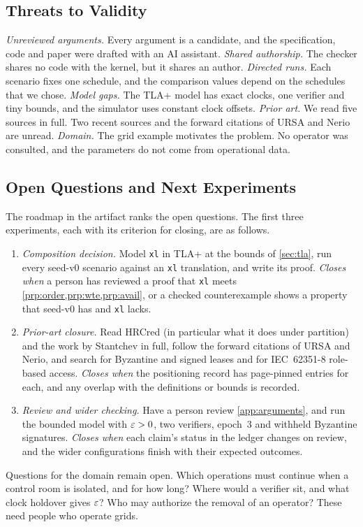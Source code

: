 \subsection{Threats to Validity}

\emph{Unreviewed arguments.} Every argument is a candidate, and the specification, code
and paper were drafted with an AI assistant. \emph{Shared authorship.} The checker shares
no code with the kernel, but it shares an author. \emph{Directed runs.} Each scenario
fixes one schedule, and the comparison values depend on the schedules that we chose.
\emph{Model gaps.} The TLA+ model has exact clocks, one verifier and tiny bounds, and the
simulator uses constant clock offsets. \emph{Prior art.} We read five sources in full. Two
recent sources and the forward citations of URSA and Nerio are unread. \emph{Domain.}
The grid example motivates the problem. No operator was consulted, and the parameters do
not come from operational data.

\subsection{Open Questions and Next Experiments}
\label{sec:open}

The roadmap in the artifact ranks the open questions. The first three experiments, each
with its criterion for closing, are as follows.
\begin{enumerate}
  \item[E1] \emph{Composition decision.} Model \texttt{xl} in TLA+ at the bounds of
  \cref{sec:tla}, run every seed-v0 scenario against an \texttt{xl} translation, and write
  its proof. \emph{Closes when} a person has reviewed a proof that \texttt{xl} meets
  \cref{prp:order,prp:wte,prp:avail}, or a checked counterexample shows a property that
  seed-v0 has and \texttt{xl} lacks.
  \item[E2] \emph{Prior-art closure.} Read HRCred (in particular what it does under partition) and
  the work by Stantchev in full, follow the forward citations of URSA and Nerio, and search
  for Byzantine and signed leases and for IEC~62351-8 role-based access. \emph{Closes when}
  the positioning record has page-pinned entries for each, and any overlap with the
  definitions or bounds is recorded.
  \item[E3] \emph{Review and wider checking.} Have a person review \cref{app:arguments}, and
  run the bounded model with $\varepsilon > 0$, two verifiers, epoch~3 and withheld Byzantine
  signatures. \emph{Closes when} each claim's status in the ledger changes on review, and
  the wider configurations finish with their expected outcomes.
\end{enumerate}
Questions for the domain remain open. Which operations must continue when a control room
is isolated, and for how long? Where would a verifier sit, and what clock holdover gives
$\varepsilon$? Who may authorize the removal of an operator? These need people who operate grids.
